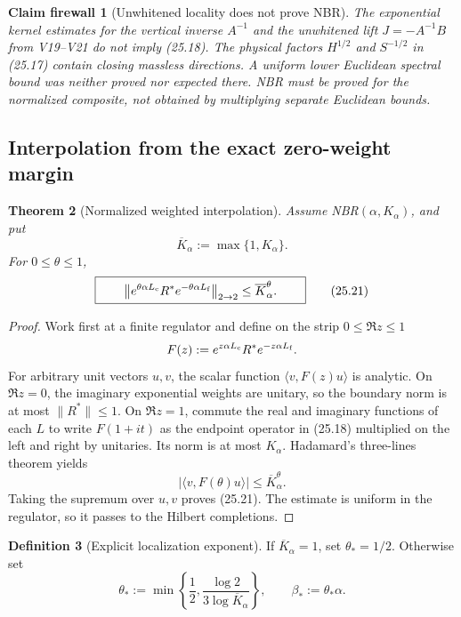 \documentclass[11pt,oneside]{book}
\newtheorem{theorem}{Theorem}[chapter]
\newtheorem{firewall}[theorem]{Claim firewall}
\theoremstyle{definition}
\newtheorem{definition}[theorem]{Definition}
\theoremstyle{remark}
\begin{document}
\begin{firewall}[Unwhitened locality does not prove NBR]
\label{fire:e8v25-unwhitened}
The exponential kernel estimates for the vertical inverse \(A^{-1}\)
and the unwhitened lift \(J=-A^{-1}B\) from V19--V21 do not imply
(25.18).  The physical factors \(H^{1/2}\) and \(S^{-1/2}\) in
(25.17) contain closing massless directions.  A uniform lower
Euclidean spectral bound was neither proved nor expected there.
NBR must be proved for the normalized composite, not obtained by
multiplying separate Euclidean bounds.
\end{firewall}

\subsection{Interpolation from the exact zero-weight margin}

\begin{theorem}[Normalized weighted interpolation]
\label{thm:e8v25-interpolation}
Assume NBR\((\alpha,K_\alpha)\), and put
\[
                         \overline K_\alpha:=\max\{1,K_\alpha\}.
                                                                    \tag{25.20}
\]
For \(0\leq\theta\leq1\),
\[
\boxed{\qquad
 \left\|
 e^{\theta\alpha L_{\rm c}}R^*
 e^{-\theta\alpha L_{\rm f}}
 \right\|_{2\to2}
 \leq\overline K_\alpha^\theta .
\qquad}                                                            \tag{25.21}
\]
\end{theorem}

\begin{proof}
Work first at a finite regulator and define on the strip
\(0\leq\Re z\leq1\)
\[
 F(z):=e^{z\alpha L_{\rm c}}R^*e^{-z\alpha L_{\rm f}}.
\]
For arbitrary unit vectors \(u,v\), the scalar function
\(\langle v,F(z)u\rangle\) is analytic.  On \(\Re z=0\), the
imaginary exponential weights are unitary, so the boundary norm is at
most \(\|R^*\|\leq1\).  On \(\Re z=1\), commute the real and imaginary
functions of each \(L\) to write \(F(1+it)\) as the endpoint operator
in (25.18) multiplied on the left and right by unitaries.  Its norm is
at most \(K_\alpha\).  Hadamard's three-lines theorem yields
\[
 |\langle v,F(\theta)u\rangle|
 \leq\overline K_\alpha^\theta.
\]
Taking the supremum over \(u,v\) proves (25.21).  The estimate is
uniform in the regulator, so it passes to the Hilbert completions.
\end{proof}

\begin{definition}[Explicit localization exponent]
\label{def:e8v25-beta-star}
If \(\overline K_\alpha=1\), set \(\theta_*=1/2\).  Otherwise set
\[
 \theta_*:=
 \min\left\{\frac12,
      \frac{\log2}{3\log\overline K_\alpha}\right\},
 \qquad \beta_*:=\theta_*\alpha.                                  \tag{25.22}
\]
\end{definition}
\end{document}
